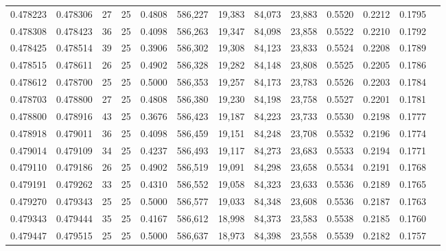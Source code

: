 \begin{tabular}{rrrrrrrrrrrrr}
0.478223 & 0.478306 &    27 &  25 &                                     0.4808 & 586,227 &  19,383 &  84,073 &  23,883 & 0.5520 & 0.2212 & 0.1795 \\
0.478308 & 0.478423 &    36 &  25 &                                     0.4098 & 586,263 &  19,347 &  84,098 &  23,858 & 0.5522 & 0.2210 & 0.1792 \\
0.478425 & 0.478514 &    39 &  25 &                                     0.3906 & 586,302 &  19,308 &  84,123 &  23,833 & 0.5524 & 0.2208 & 0.1789 \\
0.478515 & 0.478611 &    26 &  25 &                                     0.4902 & 586,328 &  19,282 &  84,148 &  23,808 & 0.5525 & 0.2205 & 0.1786 \\
0.478612 & 0.478700 &    25 &  25 &                                     0.5000 & 586,353 &  19,257 &  84,173 &  23,783 & 0.5526 & 0.2203 & 0.1784 \\
0.478703 & 0.478800 &    27 &  25 &                                     0.4808 & 586,380 &  19,230 &  84,198 &  23,758 & 0.5527 & 0.2201 & 0.1781 \\
0.478800 & 0.478916 &    43 &  25 &                                     0.3676 & 586,423 &  19,187 &  84,223 &  23,733 & 0.5530 & 0.2198 & 0.1777 \\
0.478918 & 0.479011 &    36 &  25 &                                     0.4098 & 586,459 &  19,151 &  84,248 &  23,708 & 0.5532 & 0.2196 & 0.1774 \\
0.479014 & 0.479109 &    34 &  25 &                                     0.4237 & 586,493 &  19,117 &  84,273 &  23,683 & 0.5533 & 0.2194 & 0.1771 \\
0.479110 & 0.479186 &    26 &  25 &                                     0.4902 & 586,519 &  19,091 &  84,298 &  23,658 & 0.5534 & 0.2191 & 0.1768 \\
0.479191 & 0.479262 &    33 &  25 &                                     0.4310 & 586,552 &  19,058 &  84,323 &  23,633 & 0.5536 & 0.2189 & 0.1765 \\
0.479270 & 0.479343 &    25 &  25 &                                     0.5000 & 586,577 &  19,033 &  84,348 &  23,608 & 0.5536 & 0.2187 & 0.1763 \\
0.479343 & 0.479444 &    35 &  25 &                                     0.4167 & 586,612 &  18,998 &  84,373 &  23,583 & 0.5538 & 0.2185 & 0.1760 \\
0.479447 & 0.479515 &    25 &  25 &                                     0.5000 & 586,637 &  18,973 &  84,398 &  23,558 & 0.5539 & 0.2182 & 0.1757 \\

\end{tabular}
